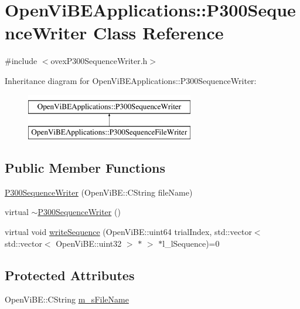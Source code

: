 \hypertarget{classOpenViBEApplications_1_1P300SequenceWriter}{
\section{OpenViBEApplications::P300SequenceWriter Class Reference}
\label{classOpenViBEApplications_1_1P300SequenceWriter}
}


{\ttfamily \#include $<$ovexP300SequenceWriter.h$>$}

Inheritance diagram for OpenViBEApplications::P300SequenceWriter:\begin{figure}[H]
\begin{center}
\leavevmode
\includegraphics[height=2.000000cm]{classOpenViBEApplications_1_1P300SequenceWriter}
\end{center}
\end{figure}
\subsection*{Public Member Functions}
\begin{DoxyCompactItemize}
\item 
\hyperlink{classOpenViBEApplications_1_1P300SequenceWriter_a47340655c35e17aef5778a25a1d912ed}{P300SequenceWriter} (OpenViBE::CString fileName)
\item 
virtual \hyperlink{classOpenViBEApplications_1_1P300SequenceWriter_a97e7bea1f79f06648dded58d255454f4}{$\sim$P300SequenceWriter} ()
\item 
virtual void \hyperlink{classOpenViBEApplications_1_1P300SequenceWriter_ab55e2121215ba8970f406883225d8f3e}{writeSequence} (OpenViBE::uint64 trialIndex, std::vector$<$ std::vector$<$ OpenViBE::uint32 $>$ $\ast$ $>$ $\ast$l\_\-lSequence)=0
\end{DoxyCompactItemize}
\subsection*{Protected Attributes}
\begin{DoxyCompactItemize}
\item 
OpenViBE::CString \hyperlink{classOpenViBEApplications_1_1P300SequenceWriter_a4a8b53458e749fe5660b23805594d68e}{m\_\-sFileName}
\end{DoxyCompactItemize}


